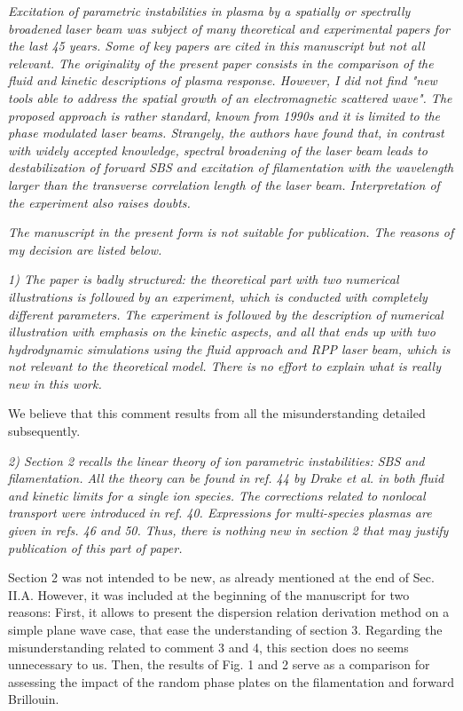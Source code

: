 \documentclass{article}
\begin{document}
\textit{
Excitation of parametric instabilities in plasma by a spatially or spectrally broadened laser beam was subject of many theoretical and experimental papers for the last 45 years. Some of key papers are cited in this manuscript but not all relevant. The originality of the present paper consists in the comparison of the fluid and kinetic descriptions of plasma response. However, I did not find "new tools able to address the spatial growth of an electromagnetic scattered wave". The proposed approach is rather standard, known from 1990s and it is limited to the phase modulated laser beams. Strangely, the authors have found that, in contrast with widely accepted knowledge, spectral broadening of the laser beam leads to destabilization of forward SBS and excitation of filamentation with the wavelength larger than the transverse correlation length of the laser beam. Interpretation of the experiment also raises doubts. }

\textit{
The manuscript in the present form is not suitable for publication. The reasons of my decision are listed below. }


\textit{
1) The paper is badly structured: the theoretical part with two numerical illustrations is followed by an experiment, which is conducted with completely different parameters. The experiment is followed by the description of numerical illustration with emphasis on the kinetic aspects, and all that ends up with two hydrodynamic simulations using the fluid approach and RPP laser beam, which is not relevant to the theoretical model. There is no effort to explain what is really new in this work. }

We believe that this comment  results from all the misunderstanding detailed subsequently. 

\textit{
2) Section 2 recalls the linear theory of ion parametric instabilities: SBS and filamentation. All the theory can be found in ref. 44 by Drake et al. in both fluid and kinetic limits for a single ion species. The corrections related to nonlocal transport were introduced in ref. 40. Expressions for multi-species plasmas are given in refs. 46 and 50. Thus, there is nothing new in section 2 that may justify publication of this part of paper. }

Section 2 was not intended to be new, as already mentioned at the end of Sec. II.A.
However, it was included at the beginning of the manuscript for two reasons: 
First, it allows to present the dispersion relation derivation  method on a simple plane wave case, that ease the understanding of section 3. Regarding the misunderstanding related to comment 3 and 4, this section does no seems unnecessary to us. Then, the results of Fig. 1 and 2 serve as a comparison for assessing the impact of the random phase plates on the filamentation and forward Brillouin. 
\end{document}
